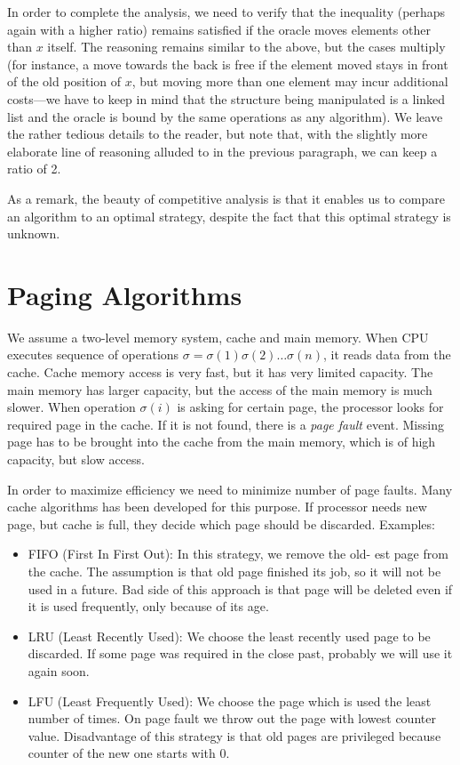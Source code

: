 \documentclass{article}
\begin{document}
In order to complete the analysis, we need to verify that the inequality
(perhaps again with a higher ratio) remains satisfied if the oracle moves
elements other than $x$ itself.  The reasoning remains similar to the above,
but the cases multiply (for instance, a move towards the back is free
if the element moved stays in front of the old position of $x$, but
moving more than one element may incur additional costs---we have to keep in
mind that the structure being manipulated is a linked list and the oracle
is bound by the same operations as any algorithm).  We leave the rather
tedious details to the reader, but note that, with the slightly
more elaborate line of reasoning alluded to in the previous paragraph,
we can keep a ratio of 2.

As a remark, the beauty of competitive analysis is that it enables
us to compare an algorithm to an optimal strategy, despite the fact
that this optimal strategy is unknown.

\section{Paging Algorithms}
\label{sec:PA}
We assume a two-level memory system, cache and main memory.
When CPU executes sequence of operations $\sigma = \sigma(1) \sigma(2) \ldots \sigma(n)$,
it reads data from the cache. Cache memory access is very fast, but it has very limited capacity.
The main memory has larger capacity, but the access of the main memory is much slower.
When operation $\sigma(i)$ is asking for certain page,
the processor looks for required page in the cache. 
If it is not found, there is a \emph{page fault} event. 
Missing page has to be brought into the cache from the main memory, which is of high capacity, but slow access.


In order to maximize efficiency we need to minimize number of page faults.
Many cache algorithms has been developed for this purpose. If processor needs
new page, but cache is full, they decide which page should be discarded. Examples:


\begin{itemize}
  \item FIFO (First In First Out): In this strategy, we remove the old-
est page from the cache. The assumption is that old page finished its job, so
it will not be used in a future. Bad side of this approach is that page will be
deleted even if it is used frequently, only because of its age.
  \item LRU (Least Recently Used): We choose the least recently used
page to be discarded. If some page was required in the close past, probably we
will use it again soon.
  \item LFU (Least Frequently Used): We choose the page which is
used the least number of times. On page fault we throw out the page with lowest
counter value. Disadvantage of this strategy is that old pages are privileged
because counter of the new one starts with 0.
\end{itemize}
\end{document}
